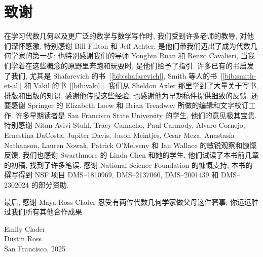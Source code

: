 \chapter*{致谢}\label{chap:acknowledgements}

在学习代数几何以及更广泛的数学与数学写作时, 我们受到许多老师的教导, 对他们深怀感激. 特别感谢 Bill Fulton 和 Jeff Achter, 是他们带我们迈出了成为代数几何学家的第一步; 也特别感谢我们的导师 Yongbin Ruan 和 Renzo Cavalieri, 当我们学着在这些概念的原野里奔跑和玩耍时, 是他们给予了指引. 许多已有的书启发了我们, 尤其是 Shafarevich 的书~[\ref{bib:shafarevich}], Smith 等人的书~[\ref{bib:smith-et-al}] 和 Vakil 的书~[\ref{bib:vakil}]. 我们从 Sheldon Axler 那里学到了大量关于写书, 排版和出版的知识. 感谢他传授这些经验, 也感谢他为早期稿件提供细致的反馈. 还要感谢 Springer 的 Elizabeth Loew 和 Brian Treadway 所做的编辑和文字校订工作. 许多早期读者是 San Francisco State University 的学生, 他们的意见极其宝贵. 特别感谢 Nitan Avivi-Stuhl, Tracy Camacho, Paul Carmody, Alvaro Cornejo, Ernestina DaCosta, Jupiter Davis, Jason Meintjes, Cesar Meza, Anastasia Nathanson, Lauren Nowak, Patrick O’Melveny 和 Ian Wallace 的敏锐观察和慷慨反馈. 我们也感谢 Swarthmore 的 Linda Chen 和她的学生, 他们试读了本书前几章的初稿, 找到了许多笔误. 感谢 National Science Foundation 的慷慨支持; 本书的撰写得到 NSF 项目 DMS–1810969, DMS–2137060, DMS–2001439 和 DMS–2302024 的部分资助.

最后, 感谢 Maya Ross Clader 忍受有两位代数几何学家做父母这件窘事; 你远远胜过我们所有其他合作成果.

\begin{flushright}
Emily Clader\\
Dustin Ross\\
San Francisco, 2025
\end{flushright}
